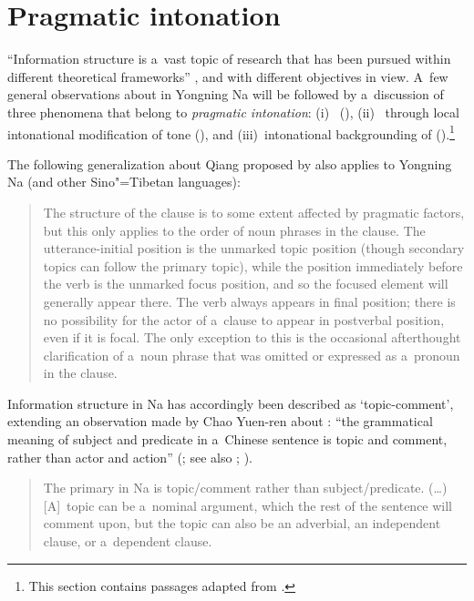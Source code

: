 \section{Pragmatic intonation}
\label{sec:pragmaticintonation}

“Information structure is a~vast topic of research that has been pursued within different theoretical frameworks” \citep[244]{krifka2008}, and with different objectives in view. A~few general observations about  in Yongning Na will be followed by a~discussion of three phenomena that belong to \textit{pragmatic intonation}: (i)~ (), (ii)~ through local intonational modification of tone (), and (iii)~intonational backgrounding of  ().\footnote{This section contains passages adapted from \citet{michaudetal2016}.}

The following generalization about Qiang proposed by \citet[221]{lapollaetal2003a} also applies to Yongning Na (and other Sino"=Tibetan languages): 

\begin{quotation}
	\begin{sloppypar} %
	The structure of the clause is to some extent affected by pragmatic factors, but this only applies to the order of noun phrases in the clause. The utterance-initial position is the unmarked topic position (though secondary topics can follow the primary topic), while the position immediately before the verb is the unmarked focus position, and so the focused element will generally appear there. The verb always appears in final position; there is no possibility for the actor of a~clause to appear in postverbal position, even if it is focal. The only exception to this is the occasional afterthought clarification of a~noun phrase that was omitted or expressed as a~pronoun in the clause.
	\end{sloppypar}
\end{quotation}

{\noindent}Information structure in Na has accordingly been described as ‘topic-comment’, extending an observation made by Chao Yuen-ren about : “the grammatical meaning of subject and predicate in a~Chinese sentence is topic and comment, rather than actor and action” (\citealt[69]{chao1968}; see also \citealt{shi2000}; \citealt{lapolla2009}). 
\begin{quotation}
The primary  in Na is topic/comment rather than subject/predicate. ({\dots}) [A]~topic can be a~nominal argument, which the rest of the sentence will comment upon, but the topic can also be an {adverbial}, an independent clause, or a~dependent clause. \citep[296]{lidz2010}
\end{quotation}

